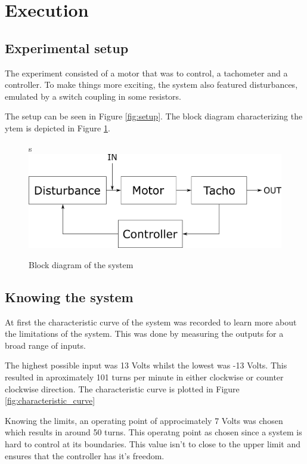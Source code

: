 \section{Execution}

\subsection{Experimental setup}

The experiment consisted of a motor that was to control, a tachometer and a controller. To make things more exciting, the system also featured disturbances, emulated by a switch coupling in some resistors.

The setup can be seen in Figure \ref{fig:setup}. The block diagram characterizing the ytem is depicted in Figure \ref{fig:blockdiagram}.

\begin{figure}[H]
\begin{center}s
\includegraphics[width=0.6\linewidth]{images/general/motor_system}
\end{center}
\caption{Block diagram of the system}
\label{fig:blockdiagram}
\end{figure}

\subsection{Knowing the system}

At first the characteristic curve of the system was recorded to learn more about the limitations of the system. This was done by measuring the outputs for a broad range of inputs.

The highest possible input was 13 Volts whilst the lowest was -13 Volts. This resulted in aproximately 101 turns per minute in either clockwise or counter clockwise direction.
The characteristic curve is plotted in Figure \ref{fig:characteristic_curve}

Knowing the limits, an operating point of approcimately 7 Volts was chosen which results in around 50 turns. This operatng point as chosen since a system is hard to control at its boundaries. This value isn't to close to the upper limit and ensures that the controller has it's freedom.

